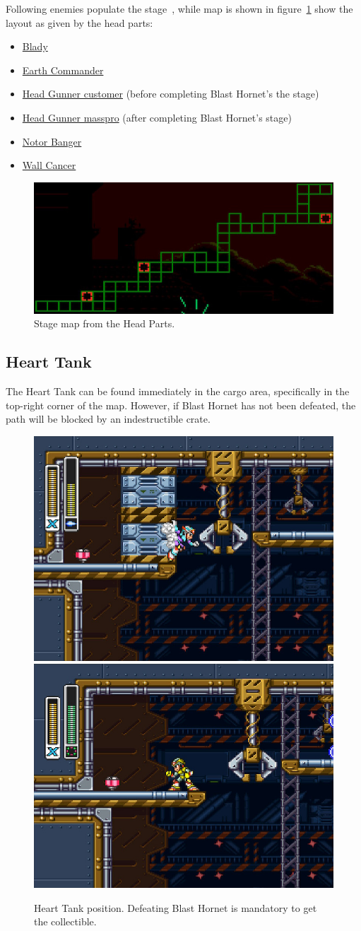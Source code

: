 Following enemies populate the stage~\cite{wiki:Airborne_carrier}, while map is shown in figure~\ref{fig:Airborne_carrier_map} show the layout as given by the head parts: 
\begin{itemize}
	\item \hyperlink{enem:Blady}{Blady} 
	\item \hyperlink{enem:Earth_Commander}{Earth Commander}
	\item \hyperlink{enem:Head_Gunner_customer}{Head Gunner customer} (before completing Blast Hornet's the stage)
	\item \hyperlink{enem:Head_Gunner_masspro}{Head Gunner masspro} (after completing Blast Hornet's  stage)
	\item \hyperlink{enem:Notor_Banger}{Notor Banger}
	\item \hyperlink{enem:Wall_Cancer}{Wall Cancer}
\end{itemize}

\begin{figure}[htp]
	\centering
	\includegraphics[width=.7\linewidth]{figures/X3/Gravity_beetle/Map.jpg}
	\caption{Stage map from the Head Parts.}
	\label{fig:Airborne_carrier_map}
\end{figure}


\subsection{Heart Tank}
The Heart Tank can be found immediately in the cargo area, specifically in the top-right corner of the map. However, if Blast Hornet has not been defeated, the path will be blocked by an indestructible crate.
\begin{figure}[htp]
	\centering
	\includegraphics[width=.4\linewidth]{figures/X3/Gravity_beetle/Heart_1.jpg}
	\includegraphics[width=.4\linewidth]{figures/X3/Gravity_beetle/Heart_2.jpg}
	\caption{Heart Tank position. Defeating Blast Hornet is mandatory to get the collectible.}
\end{figure}

